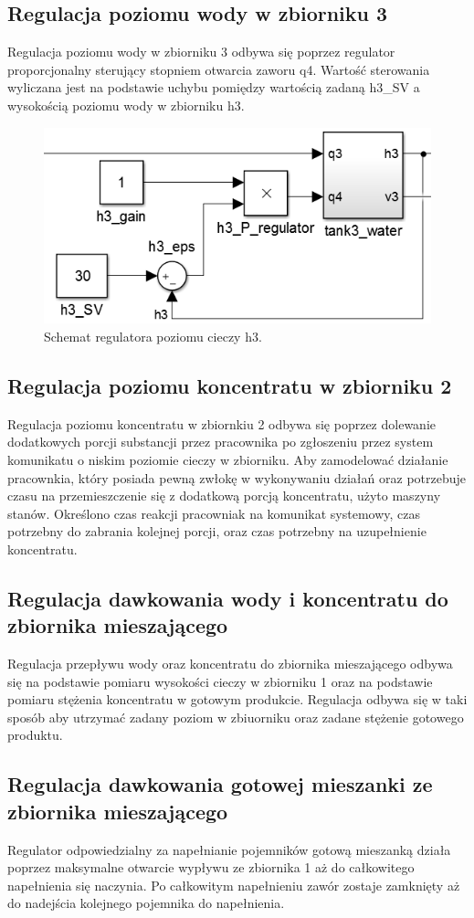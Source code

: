 \subsection{Regulacja poziomu wody w zbiorniku 3}
\indent Regulacja poziomu wody w zbiorniku 3 odbywa się poprzez regulator proporcjonalny sterujący stopniem otwarcia zaworu q4. Wartość sterowania wyliczana jest na podstawie uchybu pomiędzy wartością zadaną {h3\_SV} a wysokością poziomu wody w zbiorniku h3.
\begin{figure}[H]
	\centering
	\includegraphics[scale = 0.4]{fig/h3_regulator.png}
	\caption{Schemat regulatora poziomu cieczy h3.}
	\label{fig:h3reg}
\end{figure}
\subsection{Regulacja poziomu koncentratu w zbiorniku 2}
\indent Regulacja poziomu koncentratu w zbiornkiu 2 odbywa się poprzez dolewanie dodatkowych porcji substancji przez pracownika po zgłoszeniu przez system komunikatu o niskim poziomie cieczy w zbiorniku. Aby zamodelować działanie pracownkia, który posiada pewną zwłokę w wykonywaniu działań oraz potrzebuje czasu na przemieszczenie się z dodatkową porcją koncentratu, użyto maszyny stanów. Określono czas reakcji pracowniak na komunikat systemowy, czas potrzebny do zabrania kolejnej porcji, oraz czas potrzebny na uzupełnienie koncentratu.
\subsection{Regulacja dawkowania wody i koncentratu do zbiornika mieszającego}
\indent Regulacja przepływu wody oraz koncentratu do zbiornika mieszającego odbywa się na podstawie pomiaru wysokości cieczy w zbiorniku 1 oraz na podstawie pomiaru stężenia koncentratu w gotowym produkcie. Regulacja odbywa się w taki sposób aby utrzymać zadany poziom w zbiuorniku oraz zadane stężenie gotowego produktu.
\subsection{Regulacja dawkowania gotowej mieszanki ze zbiornika mieszającego}
\indent Regulator odpowiedzialny za napełnianie pojemników gotową mieszanką działa poprzez maksymalne otwarcie wypływu ze zbiornika 1 aż do całkowitego napełnienia się naczynia. Po całkowitym napełnieniu zawór zostaje zamknięty aż do nadejścia kolejnego pojemnika do napełnienia.
